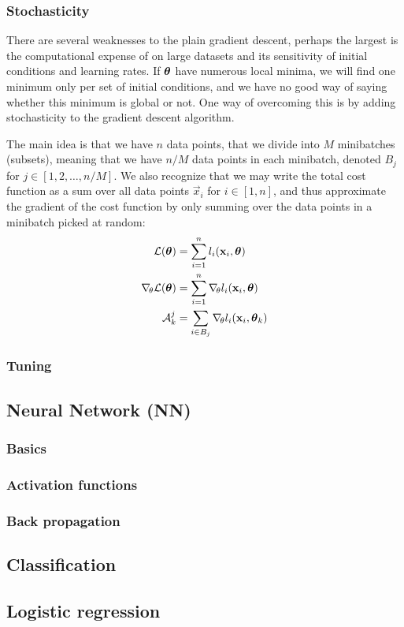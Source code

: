     \subsubsection{Stochasticity}\label{sec:stochasticity}
        There are several weaknesses to the plain gradient descent, perhaps the largest is the computational expense of on large datasets and its sensitivity of initial conditions and learning rates. If $\boldsymbol{\theta}$ have numerous local minima, we will find one minimum only per set of initial conditions, and we have no good way of saying whether this minimum is global or not. One way of overcoming this is by adding stochasticity to the gradient descent algorithm. 

        The main idea is that we have $n$ data points, that we divide into $M$ minibatches (subsets), meaning that we have $n/M$ data points in each minibatch, denoted $B_j$ for $j\in[1,2,\dots,n/M]$. We also recognize that we may write the total cost function as a sum over all data points $\vec{x}_i$ for $i\in[1,n]$, and thus approximate the gradient of the cost function by only summing over the data points in a minibatch picked at random:
        \begin{align}
            \mathcal{L}(\boldsymbol{\theta}) &= \sum_{i=1}^nl_i(\mathbf{x}_i, \boldsymbol{\theta}) \nonumber \\
            \nabla_{\!\theta} \mathcal{L}(\boldsymbol{\theta}) &= \sum_{i=1}^n \nabla_{\!\theta}l_i(\mathbf{x}_i,\boldsymbol{\theta}) \nonumber \\
            \mathcal{A}^j_k &= \sum_{i\in B_j}\nabla_{\!\theta} l_i(\mathbf{x}_i, \boldsymbol{\theta}_k)
        \end{align}
    \subsubsection{Tuning}\label{sec:tuning}

\subsection{Neural Network (NN)}\label{sec:neural_network}

    \subsubsection{Basics}\label{sec:basics}

    \subsubsection{Activation functions}\label{sec:activation_function}

    \subsubsection{Back propagation}\label{sec:back_propagation}

\subsection{Classification}\label{sec:classification}

\subsection{Logistic regression}\label{sec:logistic_regression}

